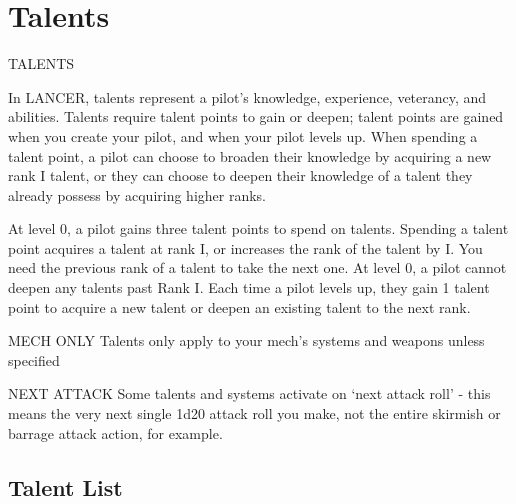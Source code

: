 \section{Talents}
    TALENTS

In LANCER, talents represent a pilot’s knowledge, experience, veterancy, and abilities. Talents
require talent points to gain or deepen; talent points are gained when you create your pilot, and
when your pilot levels up. When spending a talent point, a pilot can choose to broaden their
knowledge by acquiring a new rank I talent, or they can choose to deepen their knowledge of a
talent they already possess by acquiring higher ranks.


At level 0, a pilot gains three talent points to spend on talents. Spending a talent point acquires a
talent at rank I, or increases the rank of the talent by I. You need the previous rank of a talent to
take the next one. At level 0, a pilot cannot deepen any talents past Rank I. Each time a pilot
levels up, they gain 1 talent point to acquire a new talent or deepen an existing talent to the next
rank.


                                                MECH ONLY
Talents only apply to your mech’s systems and weapons unless specified


                                               NEXT ATTACK
Some talents and systems activate on ‘next attack roll’  - this means the very next single 1d20
attack roll you make, not the entire skirmish or barrage attack action, for example.

\subsection{Talent List}





























